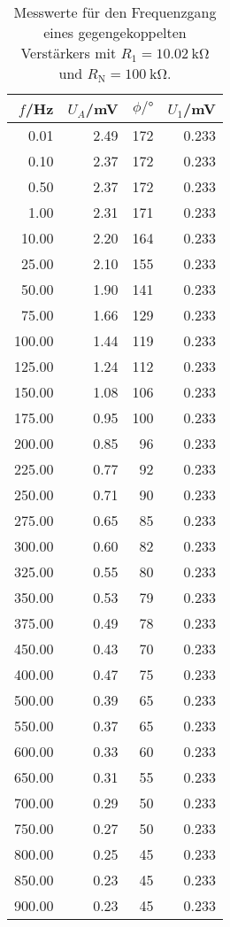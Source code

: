\begin{table}
  \centering
\begin{tabular}{rrrr}
     $f$/Hz &  $U_A$/mV &  $\phi/\si{\degree}$ &  $U_1$/mV \\
\midrule
   0.01 &  2.49 &  172 &  0.233 \\
   0.10 &  2.37 &  172 &  0.233 \\
   0.50 &  2.37 &  172 &  0.233 \\
   1.00 &  2.31 &  171 &  0.233 \\
  10.00 &  2.20 &  164 &  0.233 \\
  25.00 &  2.10 &  155 &  0.233 \\
  50.00 &  1.90 &  141 &  0.233 \\
  75.00 &  1.66 &  129 &  0.233 \\
 100.00 &  1.44 &  119 &  0.233 \\
 125.00 &  1.24 &  112 &  0.233 \\
 150.00 &  1.08 &  106 &  0.233 \\
 175.00 &  0.95 &  100 &  0.233 \\
 200.00 &  0.85 &   96 &  0.233 \\
 225.00 &  0.77 &   92 &  0.233 \\
 250.00 &  0.71 &   90 &  0.233 \\
 275.00 &  0.65 &   85 &  0.233 \\
 300.00 &  0.60 &   82 &  0.233 \\
 325.00 &  0.55 &   80 &  0.233 \\
 350.00 &  0.53 &   79 &  0.233 \\
 375.00 &  0.49 &   78 &  0.233 \\
 450.00 &  0.43 &   70 &  0.233 \\
 400.00 &  0.47 &   75 &  0.233 \\
 500.00 &  0.39 &   65 &  0.233 \\
 550.00 &  0.37 &   65 &  0.233 \\
 600.00 &  0.33 &   60 &  0.233 \\
 650.00 &  0.31 &   55 &  0.233 \\
 700.00 &  0.29 &   50 &  0.233 \\
 750.00 &  0.27 &   50 &  0.233 \\
 800.00 &  0.25 &   45 &  0.233 \\
 850.00 &  0.23 &   45 &  0.233 \\
 900.00 &  0.23 &   45 &  0.233 \\
\end{tabular}
\caption{Messwerte für den Frequenzgang eines gegengekoppelten Verstärkers mit $R_1 = \SI{10.02}{\kilo\ohm}$ und $R_\text{N} = \SI{100}{\kilo\ohm}$.}
\end{table}

